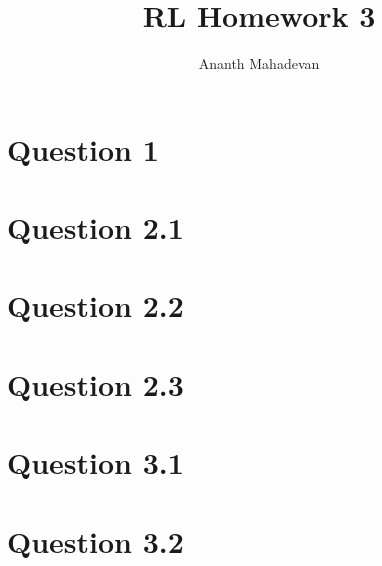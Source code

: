 \documentclass[a4paper]{article}
\title{RL Homework 3}
\author{Ananth Mahadevan}
\begin{document}
\maketitle
\clearpage
\tableofcontents
\clearpage

\section{Question 1}

\section{Question 2.1}
\section{Question 2.2}
\section{Question 2.3}
\section{Question 3.1}
\section{Question 3.2}
\end{document}
